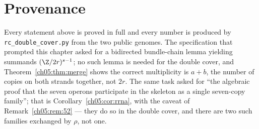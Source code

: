 \section*{Provenance}

Every statement above is proved in full and every number is produced
by \texttt{rc\_double\_cover.py} from the two public genomes. The specification that prompted this
chapter asked for a bidirected bundle-chain lemma yielding summands
$(\Z/2r)^{s-1}$; no such lemma is needed for the double cover, and
Theorem~\ref{ch05:thm:merge} shows the correct multiplicity is $a+b$, the number of copies on
both strands together, not $2r$. The same task asked for ``the algebraic proof that the
seven operons participate in the skeleton as a single seven-copy family''; that is
Corollary~\ref{ch05:cor:rrna}, with the caveat of Remark~\ref{ch05:rem:52} --- they do so in the
double cover, and there are two such families exchanged by $\rho$, not one.
